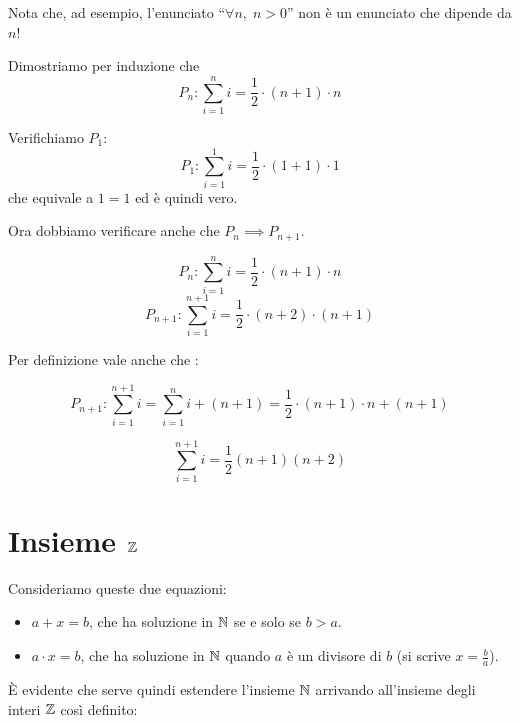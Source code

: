 Nota che, ad esempio, l'enunciato ``$\forall n,\;n > 0$'' non è un enunciato che dipende da $n$!

\begin{example}
Dimostriamo per induzione che
\begin{equation*}
P_n : \sum\limits_{i=1}^n i = \frac{1}{2} \cdot (n+1) \cdot n
\end{equation*}

Verifichiamo $P_1$: 
\begin{equation*}
P_1 : \sum\limits_{i=1}^1 i = \frac{1}{2} \cdot (1+1) \cdot 1
\end{equation*}
che equivale a $1 = 1$ ed è quindi vero.

Ora dobbiamo verificare anche che $P_n \implies P_{n+1}$.

\begin{equation*}
P_n : \sum\limits_{i=1}^n i = \frac{1}{2} \cdot (n+1) \cdot n
\end{equation*}
\begin{equation*}
P_{n+1} : \sum\limits_{i=1}^{n+1} i = \frac{1}{2} \cdot (n+2) \cdot (n+1)
\end{equation*}

Per definizione vale anche che :

\begin{equation*}
P_{n+1} : \sum\limits_{i=1}^{n+1} i = \sum\limits_{i=1}^n i + (n + 1) =  \frac{1}{2} \cdot (n+1) \cdot n + (n+1)
\end{equation*}

\begin{equation*}
\sum\limits_{i=1}^{n+1} i = \frac{1}{2} (n+1) (n+2)
\end{equation*}

\end{example}

\section{Insieme $\mathbb Z$}

Consideriamo queste due equazioni:
\begin{itemize}
\item $a+x=b$, che ha soluzione in $\mathbb N$ se e solo se $b > a$.
\item $a \cdot x = b$, che ha soluzione in $\mathbb N$ quando $a$ è un divisore di $b$ (si scrive $x = \frac{b}{a}$).
\end{itemize}

È evidente che serve quindi estendere l'insieme $\mathbb N$ arrivando all'insieme degli interi $\mathbb Z$ così definito:

